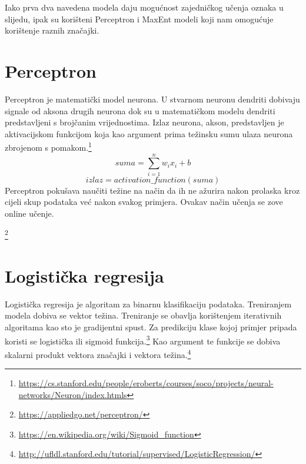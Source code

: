 \documentclass[times, utf8, seminar]{fer}
\begin{document}
Iako prva dva navedena modela daju mogućnost zajedničkog učenja oznaka u slijedu, ipak su korišteni Perceptron i MaxEnt modeli koji nam omogućuje korištenje raznih značajki.
\section{Perceptron}
\indent Perceptron je matematički model neurona. U stvarnom neuronu dendriti dobivaju signale od aksona drugih neurona dok su u matematičkom modelu dendriti predstavljeni s brojčanim vrijednostima. Izlaz neurona, akson, predstavljen je aktivacijskom funkcijom koja kao argument prima težinsku sumu ulaza neurona zbrojenom s pomakom.\footnote{\url{https://cs.stanford.edu/people/eroberts/courses/soco/projects/neural-networks/Neuron/index.htmls}}
\[ suma = \sum_{i=1}^{n} w_ix_i + b\]
\[ izlaz = activation\_function(suma) \]
\newpage
Perceptron pokušava naučiti težine na način da ih ne ažurira nakon prolaska kroz cijeli skup podataka već nakon svakog primjera. Ovakav način učenja se zove online učenje.  
\begin{center}
\footnote{\url{https://appliedgo.net/perceptron/}}
\end{center}
\newpage
\section{Logistička regresija}
Logistička regresija je algoritam za binarnu klasifikaciju podataka. Treniranjem modela dobiva se vektor težina. Treniranje se obavlja korištenjem iterativnih algoritama kao sto je gradijentni spust.
Za predikciju klase kojoj primjer pripada koristi se logistička ili sigmoid funkcija.\footnote{\url{https://en.wikipedia.org/wiki/Sigmoid_function}} Kao argument te funkcije se dobiva skalarni produkt vektora značajki i vektora težina.\footnote{\url{http://ufldl.stanford.edu/tutorial/supervised/LogisticRegression/}}
\end{document}
